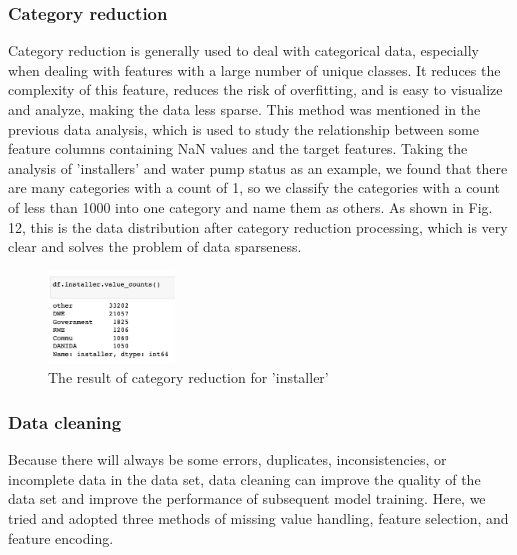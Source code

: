\documentclass[conference]{IEEEtran}
\begin{document}
\subsubsection{Category reduction}

Category reduction is generally used to deal with categorical data, especially when dealing with features with a large number of unique classes. It reduces the complexity of this feature, reduces the risk of overfitting, and is easy to visualize and analyze, making the data less sparse. This method was mentioned in the previous data analysis, which is used to study the relationship between some feature columns containing NaN values and the target features. Taking the analysis of 'installers' and water pump status as an example, we found that there are many categories with a count of 1, so we classify the categories with a count of less than 1000 into one category and name them as others. As shown in Fig. 12, this is the data distribution after category reduction processing, which is very clear and solves the problem of data sparseness.

\begin{figure}[H]
\centerline{\includegraphics[width=0.3\textwidth]{11.pic.jpg}}
\caption{The result of category reduction for 'installer'}
\end{figure}
    
\subsubsection{Data cleaning}

Because there will always be some errors, duplicates, inconsistencies, or incomplete data in the data set, data cleaning can improve the quality of the data set and improve the performance of subsequent model training. Here, we tried and adopted three methods of missing value handling, feature selection, and feature encoding.
\end{document}
